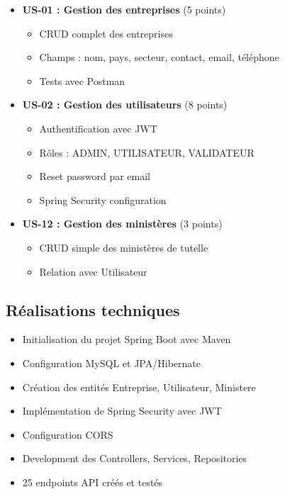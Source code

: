 \documentclass[12pt,a4paper]{report}
\begin{document}
\begin{itemize}[leftmargin=1cm]
    \item \textbf{US-01 : Gestion des entreprises} (5 points)
    \begin{itemize}
        \item CRUD complet des entreprises
        \item Champs : nom, pays, secteur, contact, email, téléphone
        \item Tests avec Postman
    \end{itemize}
    
    \item \textbf{US-02 : Gestion des utilisateurs} (8 points)
    \begin{itemize}
        \item Authentification avec JWT
        \item Rôles : ADMIN, UTILISATEUR, VALIDATEUR
        \item Reset password par email
        \item Spring Security configuration
    \end{itemize}
    
    \item \textbf{US-12 : Gestion des ministères} (3 points)
    \begin{itemize}
        \item CRUD simple des ministères de tutelle
        \item Relation avec Utilisateur
    \end{itemize}
\end{itemize}

\subsection*{Réalisations techniques}

\begin{itemize}[leftmargin=1cm]
    \item Initialisation du projet Spring Boot avec Maven
    \item Configuration MySQL et JPA/Hibernate
    \item Création des entités Entreprise, Utilisateur, Ministere
    \item Implémentation de Spring Security avec JWT
    \item Configuration CORS
    \item Development des Controllers, Services, Repositories
    \item 25 endpoints API créés et testés
\end{itemize}
\end{document}

